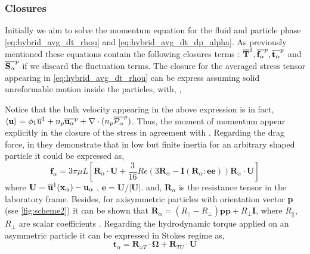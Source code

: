 \subsubsection*{Closures}
Initially we aim to solve the momentum equation for the fluid and particle phase \ref{eq:hybrid_avg_dt_rhou} and \ref{eq:hybrid_avg_dt_dp_alpha}. 
As previously mentioned these equations contain the following closures terms : $\overline{\textbf{T}}^1, \overline{\textbf{f}_\alpha}^{p}, \overline{\textbf{t}_\alpha}^{p}$ and $\overline{\textbf{S}_\alpha}^{p}$ if we discard the fluctuation terms.
The closure for the averaged stress tensor appearing in \ref{eq:hybrid_avg_dt_rhou} can be express assuming solid unreformable motion inside the particles, with, \citep{jackson1997locally},



Notice that the bulk velocity appearing in the above expression is in fact, $\left<\textbf{u}\right> = \phi_1\overline{u}^1 + n_p\overline{\textbf{u}_\alpha}^{p} + \mathbf{\nabla}\cdot (n_p\overline{\mathcal{P}_\alpha}^{p})$.
Thus, the moment of momentum appear explicitly in the closure of the stress in agreement with \citet{zhang1997momentum}.  
Regarding the drag force, in  \citet{brenner1963resistance} they demonstrate that in low but finite inertia for an arbitrary shaped particle it could be expressed as,
\begin{equation}
    \textbf{f}_\alpha = 3 \pi \mu L \left[
        \textbf{R}_\alpha \cdot \textbf{U}
        + \frac{3}{16} Re  \left(
            3 \textbf{R}_\alpha 
            - \textbf{I} (\textbf{R}_\alpha : \textbf{e} \textbf{e})
        \right)
        \textbf{R}_\alpha\cdot  \textbf{U}
    \right]
\end{equation}
where $\textbf{U} = \overline{\textbf{u}}^1(\textbf{x}_\alpha)  - \textbf{u}_\alpha$ , $\textbf{e} = \textbf{U}/|\textbf{U}|$. 
and,  $\textbf{R}_\alpha$ is the resistance tensor in the laboratory frame. 
Besides, for axisymmetric particles with orientation vector \textbf{p} (sse \ref{fig:scheme2}) it can be shown that $\textbf{R}_\alpha = (R_{||} - R_\bot) \textbf{pp} + R_\bot \textbf{I}$, where $R_{||}$, $R_\bot$ are scalar coefficients \citep{guazzelli2011,kim2013microhydrodynamics}. 
Regarding the hydrodynamic torque applied on an asymmetric particle it can be expressed in Stokes regime as, 
\begin{equation}
    \textbf{t}_\alpha 
    = 
    \textbf{R}_{\omega T}\cdot \mathbf{\Omega}
     + \textbf{R}_{TU} \cdot \textbf{U} 
\end{equation}
